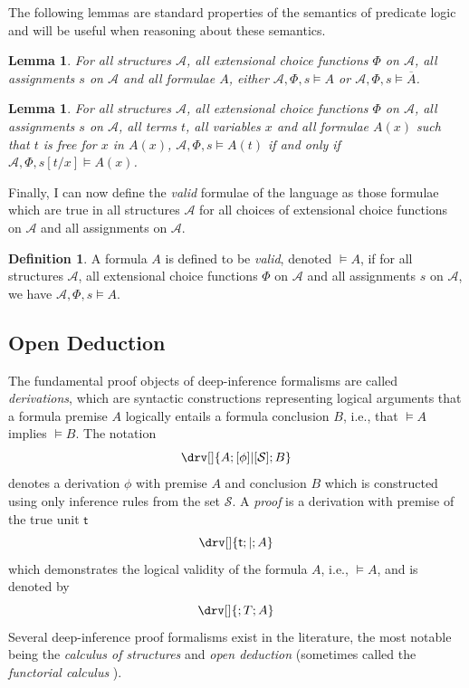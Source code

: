 \documentclass[10pt]{article}
\newtheorem{lemma}[theorem]{Lemma}
\theoremstyle{definition}\newtheorem{remark}[theorem]{Remark}
\theoremstyle{definition}\newtheorem{example}[theorem]{Example}
\theoremstyle{definition}\newtheorem{definition}[theorem]{Definition}
\newcommand{\trueUnit}{\mathsf{t}}
\begin{document}
	The following lemmas are standard properties of the semantics of predicate logic and will be useful when reasoning about these semantics.

	\begin{lemma}\label{FormulaeComplete}
		For all structures $\mathcal{A}$, all extensional choice functions $\Phi$ on $\mathcal{A}$, all assignments $s$ on $\mathcal{A}$ and all formulae $A$, either $\mathcal{A}, \Phi, s \models A$ or $\mathcal{A}, \Phi, s \models \overline{A}$.
	\end{lemma}

	\begin{lemma}\label{TermAssignmentLemma}
		For all structures $\mathcal{A}$, all extensional choice functions $\Phi$ on $\mathcal{A}$, all assignments $s$ on $\mathcal{A}$, all terms $t$, all variables $x$ and all formulae $A(x)$ such that $t$ is free for $x$ in $A(x)$,  $\mathcal{A}, \Phi, s \models A(t)$ if and only if $\mathcal{A}, \Phi, s[t / x] \models A(x)$.
	\end{lemma}

	Finally, I can now define the \textit{valid} formulae of the language as those formulae which are true in all structures $\mathcal{A}$ for all choices of extensional choice functions on $\mathcal{A}$ and all assignments on $\mathcal{A}$.

	\begin{definition}
		A formula $A$ is defined to be \textit{valid}, denoted $\models A$, if for all structures $\mathcal{A}$, all extensional choice functions $\Phi$ on $\mathcal{A}$ and all assignments $s$ on $\mathcal{A}$, we have $\mathcal{A}, \Phi, s \models A$.
	\end{definition}

	\subsection{Open Deduction}\label{OpenDeductionSection}
	
	The fundamental proof objects of deep-inference formalisms are called \textit{derivations}, which are syntactic constructions representing logical arguments that a formula premise $A$ logically entails a formula conclusion $B$, i.e., that $\models A$ implies $\models B$. The notation
	\[
		\drv[] {
			A ; [\phi]|[\mathcal{S}] ; B
		}
	\]
	denotes a derivation $\phi$ with premise $A$ and conclusion $B$ which is constructed using only inference rules from the set $\mathcal{S}$. A \textit{proof} is a derivation with premise of the true unit $\trueUnit$
	\[
		\drv[] {
			\trueUnit ; | ; A
		}
	\]
	which demonstrates the logical validity of the formula $A$, i.e., $\models A$, and is denoted by
	\[
		\drv[] {
			; T ; A
		}
	\]
	Several deep-inference proof formalisms exist in the literature, the most notable being the \textit{calculus of structures} \cite{AlessioSystemOfInteractionAndStructure} and \textit{open deduction} \cite{GuglielmiGundersenParigotOpenDeduction} (sometimes called the \textit{functorial calculus} \cite{GundersenThesis}).
	
\end{document}
